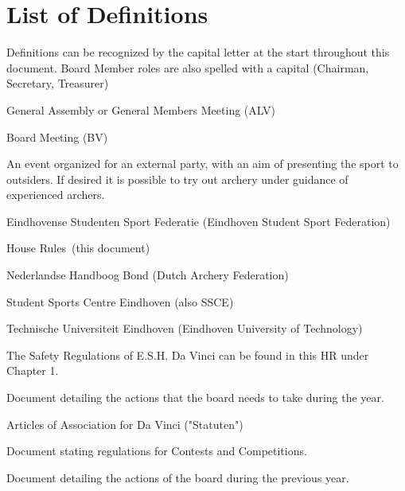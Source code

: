 \documentclass[a4paper]{article}
\newcommand{\Abr}{Administrative Regulations} %
\newcommand{\Asta}{Bylaws} %
\newcommand{\Ahr}{House Rules} %
\newcommand{\Asr}{Safety Rules} %
\newcommand{\Awr}{Contest Rules} %
\newcommand{\Ajv}{Annual Report} %
\begin{document}
\newpage

\tableofcontents
\pagebreak
\section*{List of Definitions}
{\g Definitions can be recognized by the capital letter at the start throughout this document. Board Member roles are also spelled with a capital (Chairman, Secretary, Treasurer)}

\begin{description}[font=\sffamily\bfseries, leftmargin=1cm, style=nextline]
  \item[GA]
    General Assembly or General Members Meeting (ALV)
  \item[BM]
    Board Meeting (BV)
  \item[Workshop]
    An event organized for an external party, with an aim of presenting the sport to outsiders. If desired it is possible to try out archery under guidance of experienced archers.
    \item[ESSF]
    Eindhovense Studenten Sport Federatie (Eindhoven Student Sport Federation)
    \item[HR]
    \Ahr\ (this document)
    \item[NHB]
    Nederlandse Handboog Bond (Dutch Archery Federation)
    \item[SSC]
    Student Sports Centre Eindhoven (also SSCE)
    \item[TU/e]
    Technische Universiteit Eindhoven (Eindhoven University of Technology)
    \item[\Asr]
    The Safety Regulations of E.S.H. Da Vinci can be found in this HR under Chapter 1.
\item[\Abr] Document detailing the actions that the board needs to take during the year.
\item[\Asta] Articles of Association for Da Vinci ("Statuten")
\item[\Awr] Document stating regulations for Contests and Competitions.
\item[\Ajv] Document detailing the actions of the board during the previous year.
    

\end{description}
\end{document}
